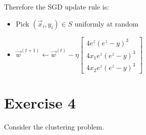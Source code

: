 \documentclass[a4paper,11pt,oneside]{book}
\begin{document}
\begin{enumerate}
\begin{solution}
        Therefore the SGD update rule is:
        \begin{itemize}
            \item Pick $(\vec{x}_i,y_i) \in S$ uniformly at random
            \item $\vec{w}^{(t+1)} \leftarrow \vec{w}^{(t)} - \eta \begin{bmatrix}
            4e^z(e^z-y)^3 \\
            4x_1e^z(e^z-y)^3 \\
            4x_2e^z(e^z-y)^3
            \end{bmatrix}$
        \end{itemize}
    \end{solution}    
\end{enumerate}

\section{Exercise 4}
Consider the clustering problem.
\end{document}

